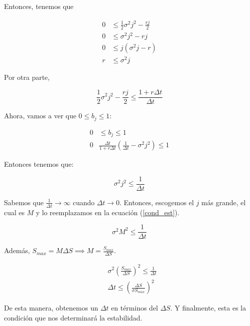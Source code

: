 \documentclass{article}
\begin{document}
Entonces, tenemos que 

\begin{align*}
    0 &\leq \frac{1}{2} \sigma^{2} j^{2} - \frac{rj}{2} \\ 
    0 &\leq \sigma^{2} j^{2} - rj \\
    0 &\leq j(\sigma^{2} j - r) \\
    r &\leq \sigma^{2} j
\end{align*}


Por otra parte, 

\begin{equation*}
   \frac{1}{2} \sigma^{2} j^{2} - \frac{rj}{2} \leq \frac{1+r\Delta t}{\Delta t}  
\end{equation*}

\smallskip

Ahora, vamos a ver que {$0 \leq b_j \leq 1$}:

\begin{align*}
    0 &\leq b_j \leq 1 \\
    0 & \frac{\Delta t}{1+r\Delta t} \left( \frac{1}{\Delta t} - \sigma^{2} j^{2} \right) \leq 1
\end{align*}

\smallskip

Entonces tenemos que: 

\begin{equation}
\label{cond_est}
\sigma^{2} j^{2} \leq \frac{1}{\Delta t}    
\end{equation}

\smallskip

Sabemos que $\frac{1}{\Delta t} \to \infty$ cuando $\Delta t \to 0$. Entonces, escogemos el $j$ más grande, el cual es $M$ y lo reemplazamos en la ecuación (\ref{cond_est}). 

\begin{equation*}
\sigma^{2} M^{2} \leq \frac{1}{\Delta t}    
\end{equation*}

Además, $S_{max} = M \Delta S \implies M = \frac{S_{max}}{\Delta S}$.

\begin{align*}
&\sigma^{2} ( \frac{S_{max}}{\Delta S} ) ^{2} \leq \frac{1}{\Delta t}    \\
&\Delta t \leq (\frac{\Delta S}{\sigma S_{max}})^2
\end{align*}

De esta manera, obtenemos un $\Delta t$ en términos del $\Delta S$. Y finalmente, esta es la condición que nos determinará la estabilidad. \\
 
\end{document}
